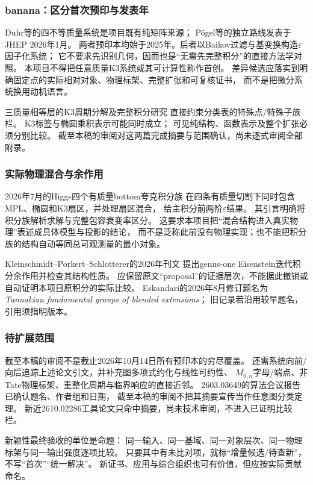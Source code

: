 \documentclass[11pt,a4paper]{ctexart}
\theoremstyle{cnplain}\newtheorem{theorem}{定理}[section]
\theoremstyle{definition}\newtheorem{definition}[theorem]{定义}
\theoremstyle{remark}\newtheorem{remark}[theorem]{注}
\begin{document}
\subsubsection{banana：区分首次预印与发表年}
Duhr等\cite{LitDMPS}的四不等质量系统是项目既有纯矩阵来源；
Pögel等\cite{LitPTWW}的独立路线发表于JHEP 2026年1月。
两者预印本均始于2025年。后者以Baikov过滤与基变换构造$\varepsilon$因子化系统；
它不要求先识别几何，因而也是“无需先完整积分”的直接方法学对照。
本项目不得把任意质量K3系统或其可计算性称作首创。
差异候选应落实到明确固定点的实际相对对象、物理标架、完整扩张和可复核证书，
而不是把微分系统换用动机语言。

三质量相等层的K3周期分解及完整积分研究\cite{LitDM,LitDMfull}
直接约束分类表的特殊点/特殊子族栏。
K3标签与椭圆乘积表示可能同时成立；
可见纯结构、函数表示及整个扩张必须分别比较。
截至本稿的审阅对这两篇完成摘要与范围确认，尚未逐式审阅全部附录。

\subsubsection{实际物理混合与余作用}
2026年7月的Higgs四个有质量bottom夸克积分族\cite{LitWWW}
在四条有质量切割下同时包含MPL、椭圆和K3扇区，并处理扇区混合，
给主积分前两阶$\varepsilon$结果。
其引言明确将积分族解析求解与完整包容衰变率区分。
这要求本项目把“混合结构进入真实物理”表述成具体模型与投影的结论，
而不是泛称此前没有物理实现；也不能把积分族的结构自动等同总可观测量的最小对象。

Kleinschmidt--Porkert--Schlotterer的2026年刊文\cite{LitKPS}
提出genus-one Eisenstein迭代积分余作用并检查其结构性质。
应保留原文“proposal”的证据层次，不能据此撤销或自动证明本项目原积分的实际比较。
Eskandari的2026年8月修订\cite{LitEsk}题名为
\emph{Tannakian fundamental groups of blended extensions}；
旧记录若沿用较早题名，引用须指明版本。

\subsubsection{待扩展范围}
截至本稿的审阅不是截止2026年10月14日所有预印本的穷尽覆盖。
还需系统向前/向后追踪上述论文引文，并补充图多项式约化与线性可约性、
$M_{0,n}$字母/端点、非Tate物理标架、重整化周期与临界响应的直接近邻。
2603.03649的算法会议报告已确认题名、作者组和日期，
截至本稿的审阅不把其摘要宣传当作任意图分类定理。
新近2610.02286工具论文只命中摘要，尚未技术审阅，不进入已证明比较栏。

新颖性最终验收的单位是命题：
同一输入、同一基域、同一对象层次、同一物理标架与同一输出强度逐项比较。
只要其中有未比对项，就标“增量候选/待查新”，不写“首次”“统一解决”。
新证书、应用与综合组织也可有价值，但应按实际贡献命名。
\end{document}

